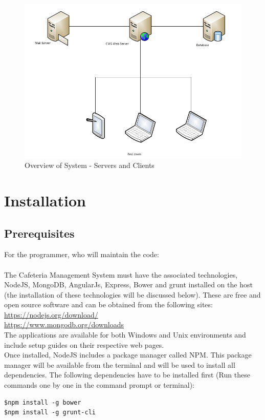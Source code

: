 \documentclass[a4paper,12pt]{report}
\begin{document}
\begin{figure}[H]
  \centering
    \includegraphics[width=1.0\textwidth]{screenshots/ServerClients.png}
    \caption{Overview of System - Servers and Clients} 
\end{figure}

\section{Installation}

\subsection{Prerequisites}
For the programmer, who will maintain the code: \\ 
\\The  Cafeteria Management System must have the associated technologies, NodeJS, MongoDB, AngularJs, Express, Bower and grunt installed on the host (the installation of these technologies will be discussed below). These are free and open source software and can be obtained from the following sites:\\
\url{https://nodejs.org/download/} \\
\url{https://www.mongodb.org/downloads} \\
The applications are available for both Windows and Unix environments and include setup guides on their respective web pages.\\

Once installed, NodeJS includes a package manager called NPM. This package manager will be available from the terminal and will be used to install all dependencies. The following dependencies have to be installed first (Run these commands one by one in the command prompt or terminal):
\begin{verbatim}
$npm install -g bower
$npm install -g grunt-cli
\end{verbatim}
\end{document}
